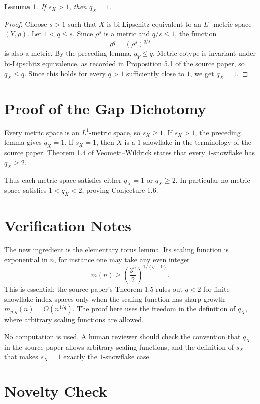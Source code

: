 \documentclass[11pt]{article}
\newtheorem{lemma}{Lemma}
\begin{document}
\begin{lemma}
If \(s_X>1\), then \(q_X=1\).
\end{lemma}

\begin{proof}
Choose \(s>1\) such that \(X\) is bi-Lipschitz equivalent to an
\(L^s\)-metric space \((Y,\rho)\). Let \(1<q\le s\). Since \(\rho^s\) is a
metric and \(q/s\le1\), the function
\[
\rho^q=(\rho^s)^{q/s}
\]
is also a metric. By the preceding lemma, \(q_Y\le q\). Metric cotype is
invariant under bi-Lipschitz equivalence, as recorded in Proposition 5.1 of the
source paper, so \(q_X\le q\). Since this holds for every \(q>1\) sufficiently
close to \(1\), we get \(q_X=1\).
\end{proof}

\section*{Proof of the Gap Dichotomy}

Every metric space is an \(L^1\)-metric space, so \(s_X\ge1\). If \(s_X>1\),
the preceding lemma gives \(q_X=1\). If \(s_X=1\), then \(X\) is a
\(1\)-snowflake in the terminology of the source paper. Theorem 1.4 of
Veomett--Wildrick states that every \(1\)-snowflake has \(q_X\ge2\).

Thus each metric space satisfies either \(q_X=1\) or \(q_X\ge2\). In
particular no metric space satisfies \(1<q_X<2\), proving Conjecture 1.6.

\section*{Verification Notes}

The new ingredient is the elementary torus lemma. Its scaling function is
exponential in \(n\), for instance one may take any even integer
\[
m(n)\ge \left(\frac{3^n}{2}\right)^{1/(q-1)}.
\]
This is essential: the source paper's Theorem 1.5 rules out \(q<2\) for
finite-snowflake-index spaces only when the scaling function has sharp growth
\(m_{p,q}(n)=O(n^{1/q})\). The proof here uses the freedom in the definition of
\(q_X\), where arbitrary scaling functions are allowed.

No computation is used. A human reviewer should check the convention that
\(q_X\) in the source paper allows arbitrary scaling functions, and the
definition of \(s_X\) that makes \(s_X=1\) exactly the \(1\)-snowflake case.

\section*{Novelty Check}
\end{document}
